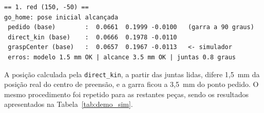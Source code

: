 \begin{lstlisting}[basicstyle=\ttfamily\scriptsize, frame=single,
                   caption={Saída do programa para a peça vermelha (posições no referencial da base, em m).},
                   label={lst:execucao}]
== 1. red (150, -50) ==
go_home: pose inicial alcançada
 pedido (base)        :  0.0661  0.1999 -0.0100   (garra a 90 graus)
 direct_kin (base)    :  0.0666  0.1978 -0.0110
 graspCenter (base)   :  0.0657  0.1967 -0.0113   <- simulador
 erros: modelo 1.5 mm OK | alcance 3.5 mm OK | juntas 0.8 graus
\end{lstlisting}

A posição calculada pela \texttt{direct\_kin}, a partir das juntas lidas, difere 1,5~mm da posição real do centro de preensão, e a garra ficou a 3,5~mm do ponto pedido. O mesmo procedimento foi repetido para as restantes peças, sendo os resultados apresentados na Tabela~\ref{tab:demo_sim}.